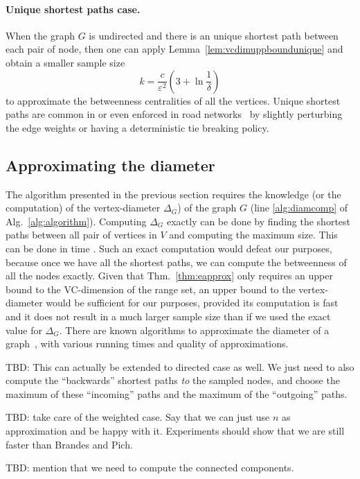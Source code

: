 \paragraph{Unique shortest paths case.} When the graph $G$ is undirected and
there is an unique shortest path between each pair of node, then one can apply
Lemma~\ref{lem:vcdimuppboundunique} and obtain a smaller sample size
\[ k= \frac{c}{\varepsilon^2}\left(3+\ln\frac{1}{\delta}\right)
\]
to approximate the betweenness centralities of all the vertices. Unique shortest
paths are common in or even enforced in road networks~\citep{GeisbergerSS08} by
slightly perturbing the edge weights or having a deterministic tie breaking
policy.

\subsection{Approximating the diameter}\label{sec:diam}
The algorithm presented in the previous section requires the knowledge (or the
computation) of the vertex-diameter $\Delta_G$) of the graph $G$ (line
\ref{alg:diamcomp} of Alg.~\ref{alg:algorithm}). Computing $\Delta_G$ exactly
can be done by finding the shortest paths between all pair of vertices in $V$
and computing the maximum size. This can be done in time \XXX. Such an exact
computation would defeat our purposes, because once we have all the shortest
paths, we can compute the betweenness of all the nodes exactly. Given that
Thm.~\ref{thm:eapprox} only requires an upper bound to the VC-dimension of the
range set, an upper bound to the vertex-diameter would be sufficient for our
purposes, provided its computation is fast and it does not result in a much
larger sample size than if we used the exact value for $\Delta_G$. There are
known algorithms to approximate the diameter of a
graph~\citep{AingwordCIM99,BoitmanisFL06,RodittyW12}, with various running times
and quality of approximations.

\XXX TBD: This can actually be extended to directed case as well. We just need
to also compute the ``backwards'' shortest paths \emph{to} the sampled nodes, and
choose the maximum of these ``incoming'' paths and the maximum of the
``outgoing'' paths. \MR

\XXX TBD: take care of the weighted case. Say that we can just use $n$ as
approximation and be happy with it. Experiments should show that we are still
faster than Brandes and Pich.

\XXX TBD: mention that we need to compute the connected components.

